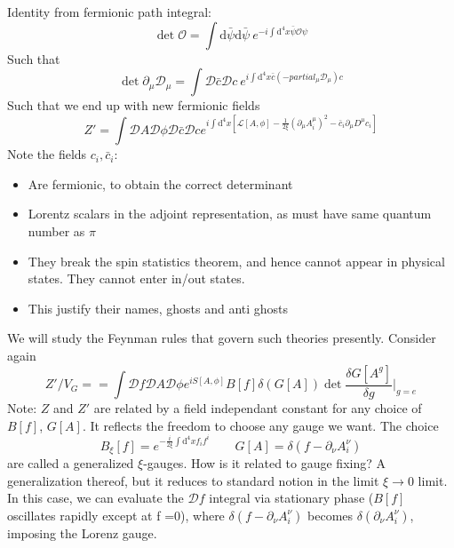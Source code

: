 \documentclass[a4paper]{book}
\theoremstyle{definition}
\theoremstyle{remark}
\begin{document}
Identity from fermionic path integral: 
\begin{equation}
    \det \mathcal O = \int \text{d}\bar \psi \text{d} \bar \psi ~e^{-i \int \text{d}^4x \bar\psi \mathcal O \psi} 
\end{equation}
Such that 
\begin{equation}
    \det \partial_\mu \mathcal D _\mu = \int \mathcal D\bar{c}\mathcal D c~ e^{i\int \text{d}^4 x \bar c (-partial_\mu \mathcal D _\mu)c}
\end{equation}
Such that we end up with new fermionic fields 
\begin{equation}
    Z' = \int \mathcal D A \mathcal D \phi \mathcal D \bar c \mathcal D c e^{i\int \text{d}^4 x \left[\mathcal L [A, \phi] - \frac{1}{2\xi}(\partial_\mu A^\mu _i )^2 - \bar c_i \partial_\mu D^\mu c_i\right]}
\end{equation}
Note the fields $c_i, \bar c_i$: 
\begin{itemize}
    \item Are fermionic, to obtain the correct determinant
    \item Lorentz scalars in the adjoint representation, as must have same quantum number as $\pi$
    \item They break the spin statistics theorem, and hence cannot appear in physical states. They cannot enter in/out states. 
    \item This justify their names, ghosts and anti ghosts
\end{itemize}

We will study the Feynman rules that govern such theories presently. Consider again 
\begin{equation}
    Z'/V_G = = \int \mathcal D f \mathcal D A \mathcal D \phi e^{iS[A, \phi]} B[f] \delta(G[A]) \det \frac{\delta G[A^{ g}]}{\delta  g} \Bigg|_{ g = e} 
\end{equation}
Note: $Z$ and $Z'$ are related by a field independant constant for any choice of $B[f]$, $G[A]$. It reflects the freedom to choose any gauge we want. The choice 
\begin{equation}
    B_\xi[f] = e^{-\frac{i}{2\xi}\int \text{d}^4x f_if^i}\qquad G[A] = \delta (f - \partial_\nu A^\nu_i )
\end{equation}
are called a generalized $\xi$-gauges. How is it related to gauge fixing? A generalization thereof, but it reduces to standard notion in the limit $\xi \rightarrow 0$ limit. In this case, we can evaluate the $\mathcal D f$ integral via stationary phase ($B[f]$ oscillates rapidly except at f =0), where $ \delta (f - \partial_\nu A^\nu_i )$ becomes $ \delta (\partial_\nu A^\nu_i )$, imposing the Lorenz gauge. 
\end{document}
